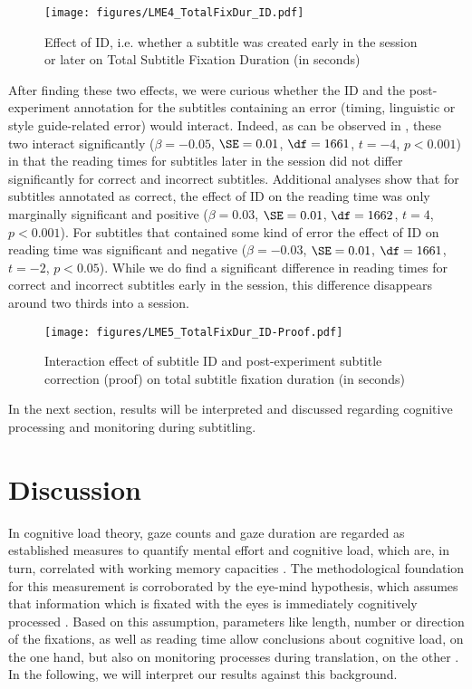 \documentclass[output=paper]{langscibook}
\begin{document}
\begin{figure}
\texttt{[image: figures/LME4\_TotalFixDur\_ID.pdf]}
%
\caption{Effect of ID, i.e.
whether a subtitle was created early in the session or later on Total Subtitle Fixation Duration (in seconds)\label{fig:6_LME4}}
\end{figure} 
 
After finding these two effects, we were curious whether the ID and the post-experiment annotation for the subtitles containing an error (timing, linguistic or style guide-related error) would interact.
Indeed, as can be observed in , these two interact significantly ($\beta=-0.05$, $\SE=0.01$, $\df=1661$, $t=-4$, $p<0.001$) in that the reading times for subtitles later in the session did not differ significantly for correct and incorrect subtitles.
Additional analyses show that for subtitles annotated as correct, the effect of ID on the reading time was only marginally significant and positive ($\beta=0.03$, $\SE=0.01$, $\df=1662$, $t=4$, $p<0.001$).
For subtitles that contained some kind of error the effect of ID on reading time was significant and negative ($\beta=-0.03$, $\SE=0.01$, $\df=1661$, $t=-2$, $p<0.05$).
While we do find a significant difference in reading times for correct and incorrect subtitles early in the session, this difference disappears around two thirds into a session.

\begin{figure}
\texttt{[image: figures/LME5\_TotalFixDur\_ID-Proof.pdf]}
%
\caption{Interaction effect of subtitle ID and post-experiment subtitle correction (proof) on total subtitle fixation duration (in seconds)\label{fig:7_LME5}}
\end{figure} 


In the next section, results will be interpreted and discussed regarding cognitive processing and monitoring during subtitling.

\section{Discussion} 
In cognitive load theory, gaze counts and gaze duration are regarded as established measures to quantify mental effort and cognitive load, which are, in turn, correlated with working memory capacities \citep{buettner2013}.
The methodological foundation for this measurement is corroborated by the eye-mind hypothesis, which assumes that information which is fixated with the eyes is immediately cognitively processed \citep{just1980theory}.
Based on this assumption, parameters like length, number or direction of the fixations, as well as reading time allow conclusions about cognitive load, on the one hand, but also on monitoring processes during translation, on the other \citep{carl-dragsted2012, schaeffer-etal2019}.
In the following, we will interpret our results against this background.
\end{document}
